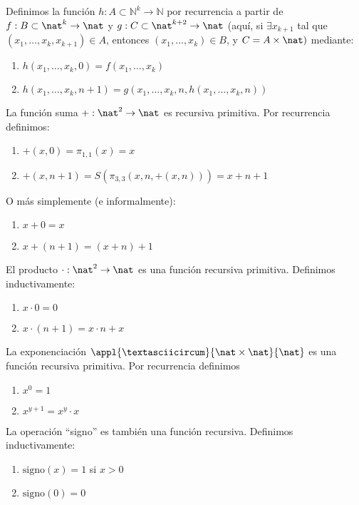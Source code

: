 \begin{defn}
	Definimos la función $h:A\subset\mathbb{N}^k\to\mathbb{N}$ por recurrencia a partir de $f:B\subset\nat^k\to \nat$ y $g:C\subset\nat^{k+2}\to\nat$ (aquí, si $\exists x_{k+1}$ tal que $(x_1, \hdots, x_k, x_{k+1})\in A$, entonces $(x_1, \hdots, x_k)\in B$, y $C=A\times\nat)$ mediante:
	\begin{enumerate}
		\item $h(x_1,\hdots, x_k,0)=f(x_1, \hdots, x_k)$
		\item $h(x_1, \hdots, x_{k}, n+1) = g(x_1, \hdots, x_k,n,h(x_1,\hdots, x_k, n))$
	\end{enumerate}
\end{defn}

\begin{example}
	La función suma $+:\nat^2\to\nat$ es  recursiva primitiva. Por recurrencia definimos:
	\begin{enumerate}
		\item $+(x,0) = \pi_{1,1}(x) = x$
		\item $+(x,n+1) =  S(\pi_{3,3}(x,n,+(x,n))) = x+n+1$
	\end{enumerate}
\end{example}

O más simplemente (e informalmente):
\begin{enumerate}
	\item $x+0 = x$
	\item $x+(n+1) = (x+n) +1$
\end{enumerate}
\begin{example}
	El producto $\cdot:\nat^2\to \nat$ es una función recursiva primitiva. Definimos inductivamente:
	\begin{enumerate}
		\item $x\cdot 0 = 0$
		\item $x\cdot(n+1) = x\cdot n + x$
	\end{enumerate}
\end{example}


\begin{example}
La exponenciación $\appl{ \textasciicircum }{\nat\times \nat}{\nat}$ es una función recursiva primitiva. Por recurrencia definimos
\begin{enumerate}
\item $x^0=1$
\item $x^{y+1} = x^y\cdot x$
\end{enumerate}
\end{example}

\begin{example}
La operación ``signo'' es también una función recursiva. Definimos inductivamente:
\begin{enumerate}
\item $\text{signo}(x)=1$ si $x>0$
\item $\text{signo}(0)=0$
\end{enumerate}
\end{example}

